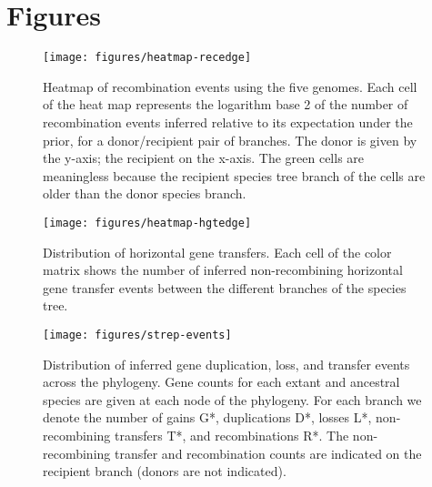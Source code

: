 \documentclass[english]{article}
\begin{document}
\section*{Figures\clearpage{}}

\begin{figure}
\texttt{[image: figures/heatmap-recedge]}
\caption{\label{fig:Heatmap-of-recombination}Heatmap of recombination events
using the five genomes.  Each cell of the heat map represents the logarithm base
2 of the number of recombination events inferred relative to its expectation
under the prior, for a donor/recipient pair of branches. The donor is given by
the y-axis; the recipient on the x-axis.  The green cells are meaningless
because the recipient species tree branch of the cells are older than the donor
species branch.}
\end{figure}
\clearpage{}

\begin{figure}
\begin{center}
\texttt{[image: figures/heatmap-hgtedge]}
\end{center}
\caption{\label{fig:hgt-heatmap}Distribution of horizontal gene transfers.
Each cell of the color matrix shows the number of inferred non-recombining
horizontal gene transfer events between the different branches of the species
tree.}
\end{figure}
\clearpage{}%

\begin{figure}
\texttt{[image: figures/strep-events]}
\caption{\label{fig:Gene-duplication-loss} Distribution of inferred gene
duplication, loss, and transfer events across the phylogeny.  Gene counts for
each extant and ancestral species are given at each node of the phylogeny.  For
each branch we denote the number of gains G*, duplications D*, losses L*,
non-recombining transfers T*, and recombinations R*.  The non-recombining
transfer and recombination counts are indicated on the recipient branch (donors
are not indicated).}
\end{figure}
\clearpage{}%
\end{document}
